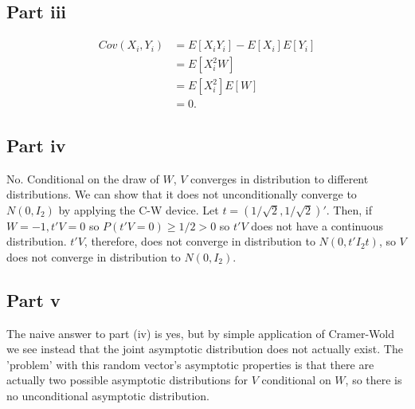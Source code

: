 \documentclass[11pt]{article} %
\begin{document}
\subsection{Part iii}
\begin{align*}
Cov(X_i,Y_i) &= E[X_iY_i] - E[X_i] E[Y_i]\\
&= E[X_i^2 W]\\
&= E[X_i^2]E[W]\\
&= 0.
\end{align*}
\subsection{Part iv}
No. Conditional on the draw of $W$, $V$ converges in distribution to different distributions. We can show that it does not unconditionally converge to $N(0,I_2)$ by applying the C-W device. Let $t = (1/\sqrt{2}, 1/\sqrt{2})'$. Then, if $W=-1, t'V = 0$ so $P(t'V=0)\geq 1/2>0$ so $t'V$ does not have a continuous distribution. $t'V$, therefore, does not converge in distribution to $N(0,t'I_2 t)$, so $V$ does not converge in distribution to $N(0,I_2)$.
\subsection{Part v}
The naive answer to part (iv) is yes, but by simple application of Cramer-Wold we see instead that the joint asymptotic distribution does not actually exist. The 'problem' with this random vector's asymptotic properties is that there are actually two possible asymptotic distributions for $V$ conditional on $W$, so there is no unconditional asymptotic distribution.
\end{document}
